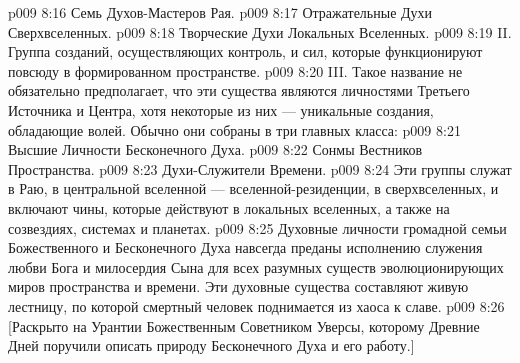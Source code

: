 \vs p009 8:16 \bibnobreakspace Семь Духов\hyp{}Мастеров Рая.
\vs p009 8:17 \bibnobreakspace Отражательные Духи Сверхвселенных.
\vs p009 8:18 \bibnobreakspace Творческие Духи Локальных Вселенных.
\vs p009 8:19 \pc II.  Группа созданий, осуществляющих контроль, и сил, которые функционируют повсюду в формированном пространстве.
\vs p009 8:20 \pc III.  Такое название не обязательно предполагает, что эти существа являются личностями Третьего Источника и Центра, хотя некоторые из них --- уникальные создания, обладающие волей. Обычно они собраны в три главных класса:
\vs p009 8:21 \bibnobreakspace Высшие Личности Бесконечного Духа.
\vs p009 8:22 \bibnobreakspace Сонмы Вестников Пространства.
\vs p009 8:23 \bibnobreakspace Духи\hyp{}Служители Времени.
\vs p009 8:24 Эти группы служат в Раю, в центральной вселенной --- вселенной\hyp{}резиденции, в сверхвселенных, и включают чины, которые действуют в локальных вселенных, а также на созвездиях, системах и планетах.
\vs p009 8:25 Духовные личности громадной семьи Божественного и Бесконечного Духа навсегда преданы исполнению служения любви Бога и милосердия Сына для всех разумных существ эволюционирующих миров пространства и времени. Эти духовные существа составляют живую лестницу, по которой смертный человек поднимается из хаоса к славе.
\vsetoff
\vs p009 8:26 [Раскрыто на Урантии Божественным Советником Уверсы, которому Древние Дней поручили описать природу Бесконечного Духа и его работу.]
